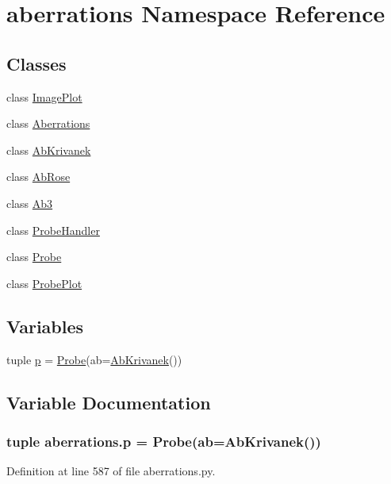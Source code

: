 \hypertarget{namespaceaberrations}{\section{aberrations Namespace Reference}
\label{namespaceaberrations}
}
\subsection*{Classes}
\begin{DoxyCompactItemize}
\item 
class \hyperlink{classaberrations_1_1_image_plot}{Image\-Plot}
\item 
class \hyperlink{classaberrations_1_1_aberrations}{Aberrations}
\item 
class \hyperlink{classaberrations_1_1_ab_krivanek}{Ab\-Krivanek}
\item 
class \hyperlink{classaberrations_1_1_ab_rose}{Ab\-Rose}
\item 
class \hyperlink{classaberrations_1_1_ab3}{Ab3}
\item 
class \hyperlink{classaberrations_1_1_probe_handler}{Probe\-Handler}
\item 
class \hyperlink{classaberrations_1_1_probe}{Probe}
\item 
class \hyperlink{classaberrations_1_1_probe_plot}{Probe\-Plot}
\end{DoxyCompactItemize}
\subsection*{Variables}
\begin{DoxyCompactItemize}
\item 
tuple \hyperlink{namespaceaberrations_a3ecdf825b3593d09a548afba6167386c}{p} = \hyperlink{classaberrations_1_1_probe}{Probe}(ab=\hyperlink{classaberrations_1_1_ab_krivanek}{Ab\-Krivanek}())
\end{DoxyCompactItemize}


\subsection{Variable Documentation}
\hypertarget{namespaceaberrations_a3ecdf825b3593d09a548afba6167386c}{
\subsubsection[{p}]{\setlength{\rightskip}{0pt plus 5cm}tuple aberrations.\-p = {\bf Probe}(ab={\bf Ab\-Krivanek}())}}\label{namespaceaberrations_a3ecdf825b3593d09a548afba6167386c}


Definition at line 587 of file aberrations.\-py.

